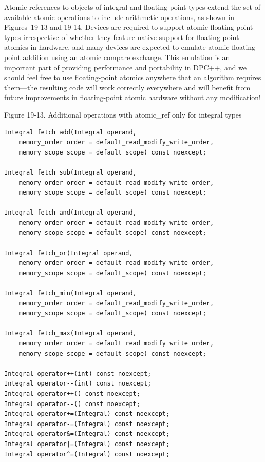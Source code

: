 Atomic references to objects of integral and floating-point types extend the set of available atomic operations to include arithmetic operations, as shown in Figures 19-13 and 19-14. Devices are required to support atomic floating-point types irrespective of whether they feature native support for floating-point atomics in hardware, and many devices are expected to emulate atomic floating-point addition using an atomic compare exchange. This emulation is an important part of providing performance and portability in DPC++, and we should feel free to use floating-point atomics anywhere that an algorithm requires them—the resulting code will work correctly everywhere and will benefit from future improvements in floating-point atomic hardware without any modification!\par

\hspace*{\fill} \par %
Figure 19-13. Additional operations with atomic\_ref only for integral types
\begin{lstlisting}[caption={}]
Integral fetch_add(Integral operand,
	memory_order order = default_read_modify_write_order,
	memory_scope scope = default_scope) const noexcept;
	
Integral fetch_sub(Integral operand,
	memory_order order = default_read_modify_write_order,
	memory_scope scope = default_scope) const noexcept;
	
Integral fetch_and(Integral operand,
	memory_order order = default_read_modify_write_order,
	memory_scope scope = default_scope) const noexcept;
	
Integral fetch_or(Integral operand,
	memory_order order = default_read_modify_write_order,
	memory_scope scope = default_scope) const noexcept;
	
Integral fetch_min(Integral operand,
	memory_order order = default_read_modify_write_order,
	memory_scope scope = default_scope) const noexcept;

Integral fetch_max(Integral operand,
	memory_order order = default_read_modify_write_order,
	memory_scope scope = default_scope) const noexcept;

Integral operator++(int) const noexcept;
Integral operator--(int) const noexcept;
Integral operator++() const noexcept;
Integral operator--() const noexcept;
Integral operator+=(Integral) const noexcept;
Integral operator-=(Integral) const noexcept;
Integral operator&=(Integral) const noexcept;
Integral operator|=(Integral) const noexcept;
Integral operator^=(Integral) const noexcept;
\end{lstlisting}


